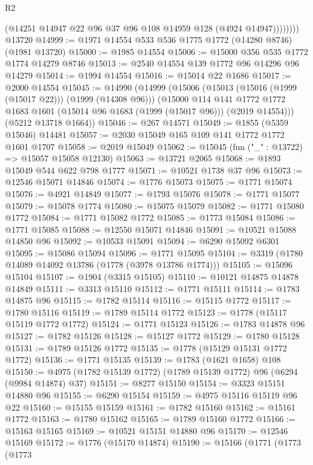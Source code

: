 \begin{lexlean}{R2}
\begin{coremodule}
                (@14251 @14947 @22 @96 @37 @96 @108 @14959 @128 (@4924 @14947))))))))
    @13720
@14999 := @1971 @14554 @533 @536 @1775 @1772 (@14280 @8746) (@1981 @13720)
@15000 := @1985 @14554
@15006 := @15000 @356 @535 @1772 @1774 @14279 @8746
@15013 := @2540 @14554 @139 @1772 @96 @14296 @96 @14279
@15014 := @1994 @14554
@15016 := @15014 @22 @1686
@15017 := @2000 @14554
@15045 := @14990
    (@14999
      (@15006
        (@15013 (@15016 (@1999 (@15017 @22))) (@1999 (@14308 @96)))
        (@15000
          @114
          @141
          @1772
          @1772
          @1683
          @1601
          (@15014 @96 @1683 (@1999 (@15017 @96)))
          (@2019 @14554)))
      (@5212 @13718 @1664))
@15046 := @267 @14571
@15049 := @1855 (@5359 @15046) @14481
@15057 := @2030 @15049 @165 @109 @141 @1772 @1772 @1601 @1707
@15058 := @2019 @15049
@15062 := @15045 (fun ("_" : @13722) => @15057 @15058 @12130)
@15063 := @13721 @2065
@15068 := @1893 @15049 @544 @622 @798 @1777
@15071 := @10521 @1738 @37 @96
@15073 := @12546 @15071 @14846
@15074 := @1776 @15073
@15075 := @1771 @15074
@15076 := @4921 @14849
@15077 := @1793 @15076
@15078 := @1771 @15077
@15079 := @15078 @1774
@15080 := @15075 @15079
@15082 := @1771 @15080 @1772
@15084 := @1771 @15082 @1772
@15085 := @1773 @15084
@15086 := @1771 @15085
@15088 := @12550 @15071 @14846
@15091 := @10521 @15088 @14850 @96
@15092 := @10533 @15091
@15094 := @6290 @15092 @6301
@15095 := @15086 @15094
@15096 := @1771 @15095
@15104 := @3319 (@1780 @14089 @14092 @13786 (@1778 (@3978 @13786 @1774)))
@15105 := @15096 @15104
@15107 := @1904 (@3315 @15105)
@15110 := @10121 @14875 @14878 @14849
@15111 := @3313 @15110
@15112 := @1771 @15111
@15114 := @1783 @14875 @96
@15115 := @1782 @15114
@15116 := @15115 @1772
@15117 := @1780 @15116
@15119 := @1789 @15114 @1772
@15123 := @1778 (@15117 @15119 @1772 @1772)
@15124 := @1771 @15123
@15126 := @1783 @14878 @96
@15127 := @1782 @15126
@15128 := @15127 @1772
@15129 := @1780 @15128
@15131 := @1789 @15126 @1772
@15135 := @1778 (@15129 @15131 @1772 @1772)
@15136 := @1771 @15135
@15139 := @1783 (@1621 @1658) @108
@15150 := @4975 (@1782 @15139 @1772) (@1789 @15139 @1772) @96 (@6294 (@9984 @14874) @37)
@15151 := @8277 @15150
@15154 := @3323 @15151 @14880 @96
@15155 := @6290 @15154
@15159 := @4975 @15116 @15119 @96 @22
@15160 := @15155 @15159
@15161 := @1782 @15160
@15162 := @15161 @1772
@15163 := @1780 @15162
@15165 := @1789 @15160 @1772
@15166 := @15163 @15165
@15169 := @10521 @15151 @14880 @96
@15170 := @12546 @15169
@15172 := @1776 (@15170 @14874)
@15190 := @15166
    (@1771
      (@1773
        (@1773

\end{coremodule}
\end{lexlean}
